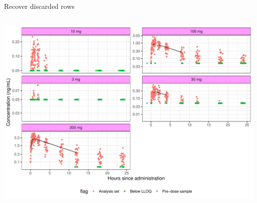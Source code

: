 \documentclass[
  8pt,
  ignorenonframetext,
  aspectratio=169]{beamer}
\begin{document}
\begin{frame}[fragile]{Recover discarded rows}
\begin{columns}[T]
\begin{column}{0.55\textwidth}
\begin{center}\includegraphics[width=1.05\linewidth]{plots/unnamed-chunk-30-1} \end{center}
\end{column}
\end{columns}
\end{frame}
\end{document}
